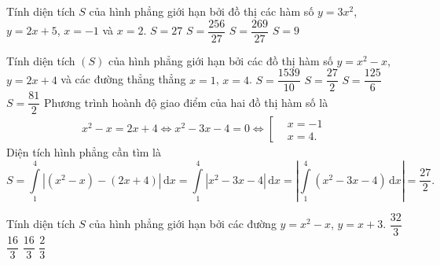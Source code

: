 \begin{ex}%
	Tính diện tích $S$ của hình phẳng giới hạn bởi đồ thị các hàm số $y=3x^2$, $y=2x+5$, $x=-1$ và $x=2$.
	\choice
	{$S=27$}
	{$S=\dfrac{256}{27}$}
	{\True $S=\dfrac{269}{27}$}
	{$S=9$}
\end{ex}

\begin{ex}%
	Tính diện tích $(S)$ của hình phẳng giới hạn bởi các đồ thị hàm số $y=x^2-x$, $y=2x+4$ và các đường thẳng thẳng $x=1$, $x=4$.
	\choice
	{$S=\dfrac{1539}{10}$}
	{\True $S=\dfrac{27}{2}$}
	{$S=\dfrac{125}{6}$}
	{$S=\dfrac{81}{2}$}
	\loigiai
	{
		Phương trình hoành độ giao điểm của hai đồ thị hàm số là
		\begin{eqnarray*}
			x^2-x=2x+4 \Leftrightarrow x^2-3x-4=0 \Leftrightarrow \left[\begin{aligned}&x=-1 \\&x=4.\end{aligned}\right.
		\end{eqnarray*}
		Diện tích hình phẳng cần tìm là
		\[S=\displaystyle\int\limits_1^4\left|\left(x^2-x\right)-(2x+4)\right|\mathrm{\,d}x = \displaystyle\int\limits_1^4\left|x^2-3x-4\right|\mathrm{\,d}x = \left|\displaystyle\int\limits_1^4\left(x^2-3x-4\right)\mathrm{\,d}x\right| = \dfrac{27}{2}.\]
	}
\end{ex}


\begin{ex}%
	Tính diện tích $S$ của hình phẳng giới hạn bởi các đường $y=x^2-x$, $y=x+3$.
	\choice
	{\True $ \dfrac{32}{3}$}
	{$ \dfrac{16}{3}$}
	{$ \dfrac{16}{3}$}
	{$ \dfrac{2}{3}$}
\end{ex}

